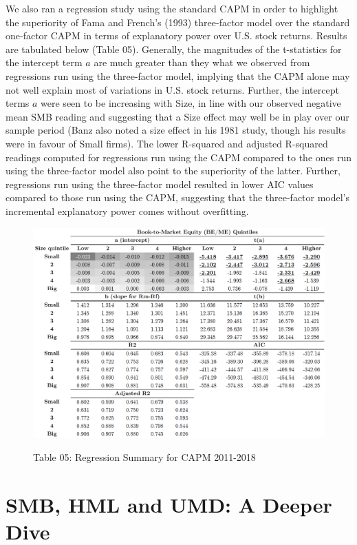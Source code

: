 \documentclass[12pt]{article}
\begin{document}
\noindent We also ran a regression study using the standard CAPM in order to highlight the superiority of Fama and French's (1993) three-factor model over the standard one-factor CAPM in terms of explanatory power over U.S. stock returns. Results are tabulated below (Table 05). Generally, the magnitudes of the t-statistics for the intercept term $a$ are much greater than they what we observed from regressions run using the three-factor model, implying that the CAPM alone may not well explain most of variations in U.S. stock returns. Further, the intercept terms $a$ were seen to be increasing with Size, in line with our observed negative mean SMB reading and suggesting that a Size effect may well be in play over our sample period (Banz also noted a size effect in his 1981 study, though his results were in favour of Small firms). The lower R-squared and adjusted R-squared readings computed for regressions run using the CAPM compared to the ones run using the three-factor model also point to the superiority of the latter. Further, regressions run using the three-factor model resulted in lower AIC values compared to those run using the CAPM, suggesting that the three-factor model's incremental explanatory power comes without overfitting.

\begin{figure}[h]
	\centering
	\caption*{Table 05: Regression Summary for CAPM 2011-2018}
	\includegraphics[width=0.88\linewidth,trim=4 4 4 4,clip]{A6.png}
	\label{fig:label}
\end{figure}

\newpage

\section{SMB, HML and UMD: A Deeper Dive}
\end{document}
